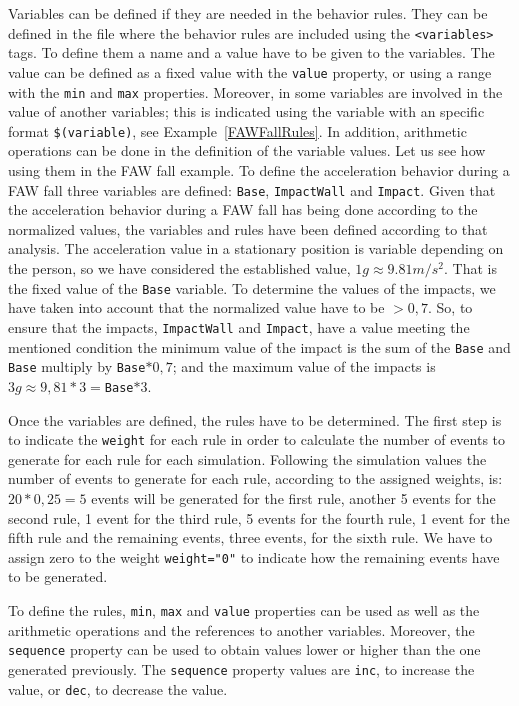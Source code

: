 \documentclass[10pt,journal,compsoc]{IEEEtran}
\begin{document}
Variables can be defined if they are needed in the behavior rules. They can be defined in the file where the behavior rules are included using the \texttt{<variables>} tags. To define them a name and a value 
have to be given to the variables. The value can be defined as a fixed value with the \texttt{value} property, or using a range with the \texttt{min} and \texttt{max} properties. Moreover, in some variables
are involved in the value of another variables; this is indicated using the variable with an specific format \texttt{\$(variable)}, see Example~\ref{FAWFallRules}. In addition, arithmetic operations can be done in the definition of the variable values. Let us see how using them in the FAW fall example. To define the acceleration behavior during a FAW fall three variables are defined: \texttt{Base}, 
\texttt{ImpactWall} and \texttt{Impact}. Given that the acceleration behavior during a FAW fall has being done according to the normalized values, the variables and rules have been defined according to that analysis. The acceleration value in a stationary position is variable depending on the person, so we have considered the established value, $1g\approx9.81m/s^{2}$. That is the fixed value of the \texttt{Base} variable. To determine the values of the impacts, we have taken into account that the 
normalized value have to be $> 0,7$. So, to ensure that the impacts, \texttt{ImpactWall} and \texttt{Impact}, have a value meeting the mentioned condition the minimum value of the impact is the sum of the \texttt{Base} and \texttt{Base} multiply by \texttt{Base}$*0,7$; and the maximum value of the impacts is $3g\approx9,81*3=$\texttt{Base}$*3$.

Once the variables are defined, the rules have to be determined. The first step is to indicate the \texttt{weight} for each rule in order to calculate the number of events to generate for each rule for each simulation. Following the simulation values the number of events to generate for each rule, according to the assigned weights, is: $20 * 0,25 = 5$ events will be generated for the first rule, another 5 events 
for the second rule, 1 event for the third rule, 5 events for the fourth rule, 1 event for the fifth rule and the remaining events, three events, for the sixth rule. We have to assign zero to the weight \texttt{weight="0"} to indicate how the remaining events have to be generated.

To define the rules, \texttt{min}, \texttt{max} and \texttt{value} properties can be used as well as the arithmetic operations and the references to another variables. Moreover, the \texttt{sequence} property can be used to obtain values lower or higher than the one generated previously. The \texttt{sequence} property values are \texttt{inc}, to increase the value, or \texttt{dec}, to decrease the value. 
\end{document}
